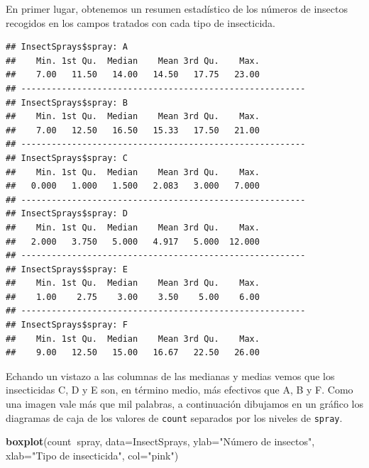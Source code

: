 \documentclass[]{book}
\newenvironment{Shaded}{\begin{snugshade}}{\end{snugshade}}
\newcommand{\DataTypeTok}[1]{\textcolor[rgb]{0.13,0.29,0.53}{#1}}
\newcommand{\KeywordTok}[1]{\textcolor[rgb]{0.13,0.29,0.53}{\textbf{#1}}}
\newcommand{\NormalTok}[1]{#1}
\newcommand{\OperatorTok}[1]{\textcolor[rgb]{0.81,0.36,0.00}{\textbf{#1}}}
\newcommand{\StringTok}[1]{\textcolor[rgb]{0.31,0.60,0.02}{#1}}
\theoremstyle{definition}
\theoremstyle{definition}
\theoremstyle{definition}
\theoremstyle{remark}
\begin{document}
En primer lugar, obtenemos un resumen estadístico de los números de insectos recogidos en los campos tratados con cada tipo de insecticida.

\begin{Shaded}
\end{Shaded}

\begin{verbatim}
## InsectSprays$spray: A
##    Min. 1st Qu.  Median    Mean 3rd Qu.    Max. 
##    7.00   11.50   14.00   14.50   17.75   23.00 
## -------------------------------------------------------- 
## InsectSprays$spray: B
##    Min. 1st Qu.  Median    Mean 3rd Qu.    Max. 
##    7.00   12.50   16.50   15.33   17.50   21.00 
## -------------------------------------------------------- 
## InsectSprays$spray: C
##    Min. 1st Qu.  Median    Mean 3rd Qu.    Max. 
##   0.000   1.000   1.500   2.083   3.000   7.000 
## -------------------------------------------------------- 
## InsectSprays$spray: D
##    Min. 1st Qu.  Median    Mean 3rd Qu.    Max. 
##   2.000   3.750   5.000   4.917   5.000  12.000 
## -------------------------------------------------------- 
## InsectSprays$spray: E
##    Min. 1st Qu.  Median    Mean 3rd Qu.    Max. 
##    1.00    2.75    3.00    3.50    5.00    6.00 
## -------------------------------------------------------- 
## InsectSprays$spray: F
##    Min. 1st Qu.  Median    Mean 3rd Qu.    Max. 
##    9.00   12.50   15.00   16.67   22.50   26.00
\end{verbatim}

Echando un vistazo a las columnas de las medianas y medias vemos que los insecticidas C, D y E son, en término medio, más efectivos que A, B y F. Como una imagen vale más que mil palabras, a continuación dibujamos en un gráfico los diagramas de caja de los valores de \texttt{count} separados por los niveles de \texttt{spray}.

\begin{Shaded}
\begin{Highlighting}[]
\KeywordTok{boxplot}\NormalTok{(count}\OperatorTok{~}\NormalTok{spray, }\DataTypeTok{data=}\NormalTok{InsectSprays, }\DataTypeTok{ylab=}\StringTok{"Número de insectos"}\NormalTok{, }
        \DataTypeTok{xlab=}\StringTok{"Tipo de insecticida"}\NormalTok{, }\DataTypeTok{col=}\StringTok{"pink"}\NormalTok{)}
\end{Highlighting}
\end{Shaded}
\end{document}

